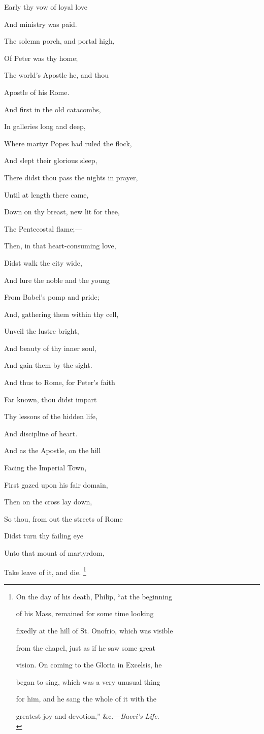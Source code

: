 Early thy vow of loyal love

And ministry was paid.

The solemn porch, and portal high,

Of Peter was thy home;

The world's Apostle he, and thou

Apostle of his Rome.

And first in the old catacombs,

In galleries long and deep,

Where martyr Popes had ruled the flock,

And slept their glorious sleep, 

There didst thou pass the nights in prayer,

Until at length there came,

Down on thy breast, new lit for thee,

The Pentecostal flame;—

Then, in that heart-consuming love,

Didst walk the city wide,

And lure the noble and the young

From Babel's pomp and pride;

And, gathering them within thy cell,

Unveil the lustre bright,

And beauty of thy inner soul,

And gain them by the sight.

And thus to Rome, for Peter's faith

Far known, thou didst impart

Thy lessons of the hidden life,

And discipline of heart.

And as the Apostle, on the hill

Facing the Imperial Town,

First gazed upon his fair domain,

Then on the cross lay down, 

So thou, from out the streets of Rome

Didst turn thy failing eye

Unto that mount of martyrdom,

Take leave of it, and die.
\footnote{On the day of his death, Philip, ``at the
beginning

of his
Mass, remained for some time looking

fixedly at the hill
of St. Onofrio, which was visible

from the chapel, just as
if he saw some great

vision. On coming to the Gloria in Excelsis, he

began to sing, which was a very unusual thing

for him, and he sang the whole of it with the

greatest joy
and devotion,'' \&c.—\emph{Bacci's Life.}\\}

